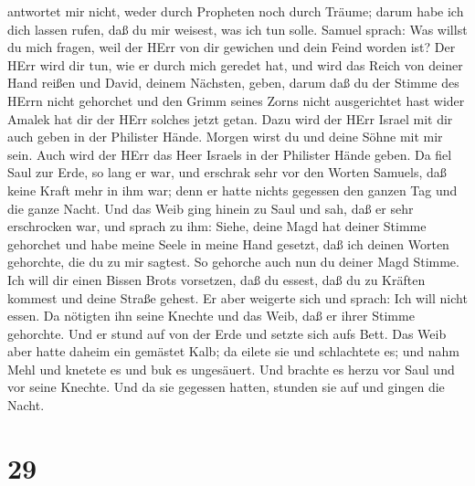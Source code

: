 antwortet mir nicht, weder durch Propheten noch durch Träume; darum habe
ich dich lassen rufen, daß du mir weisest, was ich tun solle.
 Samuel sprach: Was willst du mich fragen, weil der HErr
von dir gewichen und dein Feind worden ist?  Der HErr wird
dir tun, wie er durch mich geredet hat, und wird das Reich von deiner
Hand reißen und David, deinem Nächsten, geben,  darum daß
du der Stimme des HErrn nicht gehorchet und den Grimm seines Zorns nicht
ausgerichtet hast wider Amalek hat dir der HErr solches jetzt getan.
 Dazu wird der HErr Israel mit dir auch geben in der
Philister Hände. Morgen wirst du und deine Söhne mit mir sein. Auch wird
der HErr das Heer Israels in der Philister Hände geben.  Da
fiel Saul zur Erde, so lang er war, und erschrak sehr vor den Worten
Samuels, daß keine Kraft mehr in ihm war; denn er hatte nichts gegessen
den ganzen Tag und die ganze Nacht.  Und das Weib ging
hinein zu Saul und sah, daß er sehr erschrocken war, und sprach zu ihm:
Siehe, deine Magd hat deiner Stimme gehorchet und habe meine Seele in
meine Hand gesetzt, daß ich deinen Worten gehorchte, die du zu mir
sagtest.  So gehorche auch nun du deiner Magd Stimme. Ich
will dir einen Bissen Brots vorsetzen, daß du essest, daß du zu Kräften
kommest und deine Straße gehest.  Er aber weigerte sich und
sprach: Ich will nicht essen. Da nötigten ihn seine Knechte und das
Weib, daß er ihrer Stimme gehorchte. Und er stund auf von der Erde und
setzte sich aufs Bett.  Das Weib aber hatte daheim ein
gemästet Kalb; da eilete sie und schlachtete es; und nahm Mehl und
knetete es und buk es ungesäuert.  Und brachte es herzu vor
Saul und vor seine Knechte. Und da sie gegessen hatten, stunden sie auf
und gingen die Nacht.

\hypertarget{section-28}{%
\section{29}\label{section-28}}

